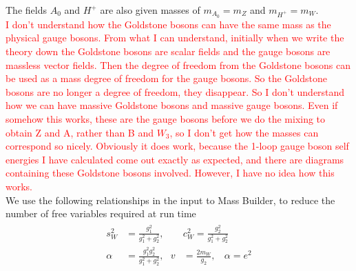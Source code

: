\documentclass[11pt]{article}
\newcommand{\mbs}{\textsf{Mass Builder}}
\begin{document}
The fields $A_0$ and $H^+$ are also given masses of $m_{A_0}=m_Z$ and $m_{H^+}=m_W$.\\
\textcolor{red}{
I don't understand how the Goldstone bosons can have the same mass as the physical gauge bosons.  From what I can understand, initially when we write the theory down the Goldstone bosons are scalar fields and the gauge bosons are massless vector fields.  Then the degree of freedom from the Goldstone bosons can be used as a mass degree of freedom for the gauge bosons.  So the Goldstone bosons are no longer a degree of freedom, they disappear.
So I don't understand how we can have massive Goldstone bosons and massive gauge bosons.  Even if somehow this works, these are the gauge bosons before we do the mixing to obtain Z and A, rather than B and $W_3$, so I don't get how the masses can correspond so nicely.
Obviously it does work, because the 1-loop gauge boson self energies I have calculated come out exactly as expected, and there are diagrams containing these Goldstone bosons involved.  However, I have no idea how this works.}\\



We use the following relationships in the input to \mbs, to reduce the number of free variables required at run time
\begin{eqnarray}
\begin{split}
s_W^2&=\frac{g_1^2}{g_1^2+g_2^2}, \ \ \ & c_W^2=\frac{g_2^2}{g_1^2+g_2^2}\\
\alpha&=\frac{g_1^2g_2^2}{g_1^2+g_2^2}, \ \ \ v&=\frac{2m_W}{g_2}, \ \ \ \ \alpha=e^2
\end{split}
\end{eqnarray}
\end{document}
